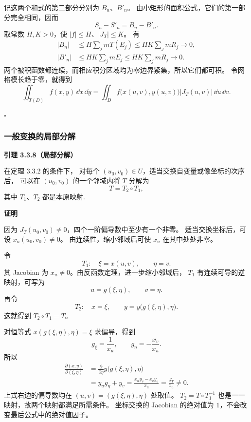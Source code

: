 记这两个和式的第二部分分别为 $B_n$、$B'_n$。
由小矩形的面积公式，它们的第一部分完全相同，因而
\[
S_n-S'_n=B_n-B'_n.
\]
取常数 $H,K>0$，使 $|f|\le H$、$|J_T|\le K$。
有
\begin{align*}
|B_n|
&\le H\sum_jmT(E_j)
 \le HK\sum_jmR_j\longrightarrow0,\\
|B'_n|
&\le HK\sum_jmE_j
 \le HK\sum_jmR_j\longrightarrow0.
\end{align*}
两个被积函数都连续，而相应积分区域均为零边界紧集，所以它们都可积。
令网格模长趋于零，就得到
\begin{equation}
\iint_{T(D)}f(x,y)\,\dd x\,\dd y
=\iint_D f\bigl(x(u,v),y(u,v)\bigr)|J_T(u,v)|\,\dd u\,\dd v.
\end{equation}


$\square$





\subsubsection*{一般变换的局部分解}



\textbf{引理 3.3.8（局部分解）}


在定理 3.3.2 的条件下，
对每个 $(u_0,v_0)\in U$，适当交换自变量或像坐标的次序后，
可以在 $(u_0,v_0)$ 的一个邻域内将 $T$ 分解为
\[
T=T_2\circ T_1,
\]
其中 $T_1$、$T_2$ 都是本原映射.





\textbf{证明}

因为 $J_T(u_0,v_0)\ne0$，四个一阶偏导数中至少有一个非零。
适当交换坐标后，可设 $x_u(u_0,v_0)\ne0$。
由连续性，缩小邻域后可使 $x_u$ 在其中处处非零。

令
\[
T_1:\quad \xi=x(u,v),\qquad \eta=v.
\]
其 Jacobian 为 $x_u\ne0$。由反函数定理，进一步缩小邻域后，
$T_1$ 有连续可导的逆映射，可写为
\[
u=g(\xi,\eta),\qquad v=\eta.
\]
再令
\[
T_2:\quad x=\xi,\qquad y=y\bigl(g(\xi,\eta),\eta\bigr).
\]
这就得到 $T_2\circ T_1=T$。

对恒等式 $x(g(\xi,\eta),\eta)=\xi$ 求偏导，得到
\[
g_\xi=\frac1{x_u},\qquad g_\eta=-\frac{x_v}{x_u}.
\]
所以
\begin{align*}
\frac{\partial(x,y)}{\partial(\xi,\eta)}
&=\frac{\partial}{\partial\eta}
 y\bigl(g(\xi,\eta),\eta\bigr)\\
&=y_ug_\eta+y_v
 =\frac{x_uy_v-x_vy_u}{x_u}
 =\frac{J_T}{x_u}\ne0.
\end{align*}
上式右边的偏导数均在 $(u,v)=(g(\xi,\eta),\eta)$ 处取值。
$T_2=T\circ T_1^{-1}$ 也是一一映射，故两个映射都满足所需条件。
坐标交换的 Jacobian 的绝对值为 $1$，不会改变最后公式中的绝对值因子。


